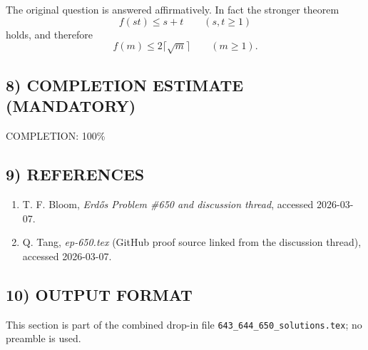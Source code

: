 The original question is answered affirmatively.  In fact the stronger theorem
\[
 f(st)\le s+t
\qquad (s,t\ge 1)
\]
holds, and therefore
\[
 f(m)\le 2\lceil\sqrt m\rceil
\qquad (m\ge 1).
\]

\subsection*{8) COMPLETION ESTIMATE (MANDATORY)}
COMPLETION: 100\%

\subsection*{9) REFERENCES}
\begin{enumerate}
\item T. F. Bloom, \emph{Erd\H{o}s Problem \#650 and discussion thread}, accessed 2026-03-07.
\item Q. Tang, \emph{ep-650.tex} (GitHub proof source linked from the discussion thread), accessed 2026-03-07.
\end{enumerate}

\subsection*{10) OUTPUT FORMAT}
This section is part of the combined drop-in file \texttt{643\_644\_650\_solutions.tex}; no preamble is used.
